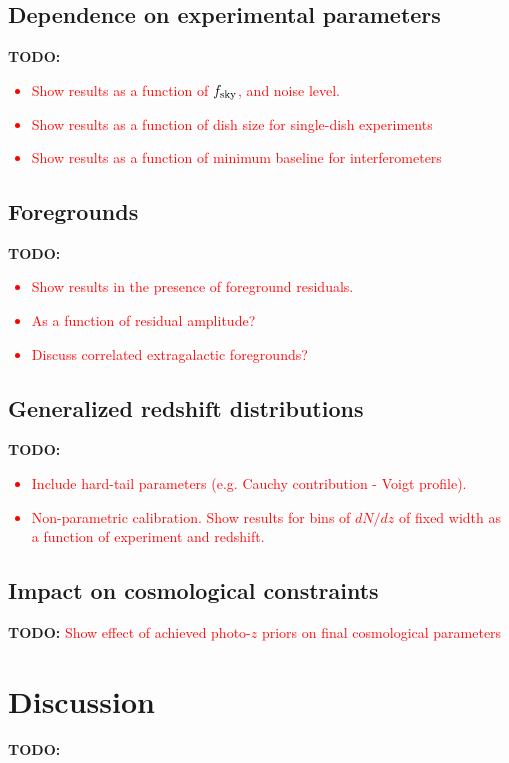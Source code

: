 \documentclass[prd,twocolumn]{revtex4}
\newcommand{\TODO}[1]{{\bf TODO:} \textcolor{red}{#1}}
\begin{document}
  \subsection{Dependence on experimental parameters} \label{ssec:results.params}
    \TODO{
      \begin{itemize}
        \item Show results as a function of $f_{\rm sky}$, and noise level.
        \item Show results as a function of dish size for single-dish experiments
        \item Show results as a function of minimum baseline for interferometers
      \end{itemize}
    }

  \subsection{Foregrounds} \label{ssec:results.foregrounds}
    \TODO{
      \begin{itemize}
        \item Show results in the presence of foreground residuals.
        \item As a function of residual amplitude?
        \item Discuss correlated extragalactic foregrounds?
      \end{itemize}
    }

  \subsection{Generalized redshift distributions} \label{ssec:results.outliers}
    \TODO{
      \begin{itemize}
        \item Include hard-tail parameters (e.g. Cauchy contribution - Voigt profile).
        \item Non-parametric calibration. Show results for bins of $dN/dz$ of fixed
          width as a function of experiment and redshift.
      \end{itemize}
    }
    
  \subsection{Impact on cosmological constraints} \label{ssec:results.cosmo}
    \TODO{Show effect of achieved photo-$z$ priors on final cosmological parameters}

\section{Discussion}\label{ssec:discuss}
  \TODO{\lipsum[12]}
\end{document}
